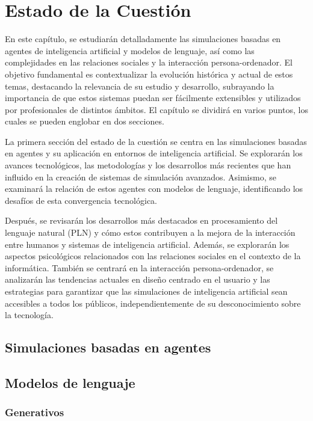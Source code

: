 \chapter{Estado de la Cuestión}
\label{cap:estadoDeLaCuestion}

En este capítulo, se estudiarán detalladamente las simulaciones basadas en agentes de inteligencia artificial y modelos de lenguaje, así como las complejidades en las relaciones sociales y la interacción persona-ordenador. El objetivo fundamental es contextualizar la evolución histórica y actual de estos temas, destacando la relevancia de su estudio y desarrollo, subrayando la importancia de que estos sistemas puedan ser fácilmente extensibles y utilizados por profesionales de distintos ámbitos. El capítulo se dividirá en varios puntos, los cuales se pueden englobar en dos secciones.

La primera sección del estado de la cuestión se centra en las simulaciones basadas en agentes y su aplicación en entornos de inteligencia artificial. Se explorarán los avances tecnológicos, las metodologías y los desarrollos más recientes que han influido en la creación de sistemas de simulación avanzados. Asimismo, se examinará la relación de estos agentes con modelos de lenguaje, identificando los desafíos de esta convergencia tecnológica.

Después, se revisarán los desarrollos más destacados en procesamiento del lenguaje natural (PLN) y cómo estos contribuyen a la mejora de la interacción entre humanos y sistemas de inteligencia artificial. Además, se explorarán los aspectos psicológicos relacionados con las relaciones sociales en el contexto de la informática. También se centrará en la interacción persona-ordenador, se analizarán las tendencias actuales en diseño centrado en el usuario y las estrategias para garantizar que las simulaciones de inteligencia artificial sean accesibles a todos los públicos, independientemente de su desconocimiento sobre la tecnología.

\section{Simulaciones basadas en agentes}
\section{Modelos de lenguaje}
\subsection{Generativos}
